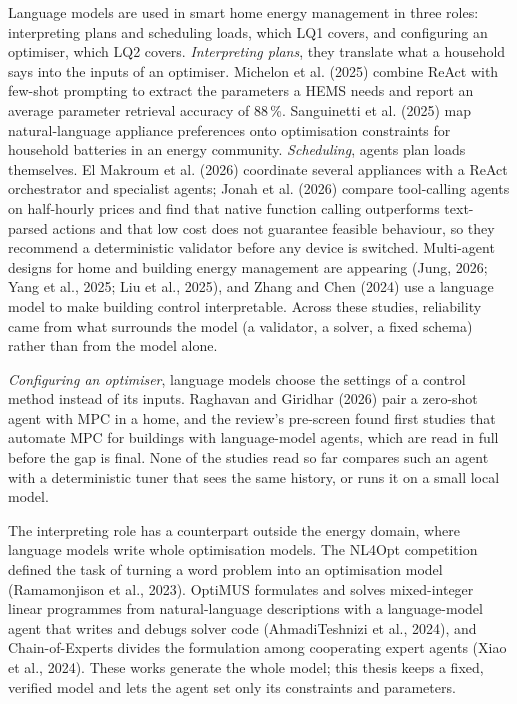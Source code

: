 \documentclass[12pt,a4paper]{report}
\begin{document}
Language models are used in smart home energy management in three
roles: interpreting plans and scheduling loads, which LQ1 covers, and
configuring an optimiser, which LQ2 covers. \textit{Interpreting
plans}, they translate what a household says into the inputs of an
optimiser. Michelon et al. (2025) combine ReAct with few-shot
prompting to extract the parameters a HEMS needs and report an average
parameter retrieval accuracy of 88\,\%. Sanguinetti et al. (2025) map
natural-language appliance preferences onto optimisation constraints
for household batteries in an energy community. \textit{Scheduling},
agents plan loads themselves. El Makroum et al. (2026) coordinate
several appliances with a ReAct orchestrator and specialist agents;
Jonah et al. (2026) compare tool-calling agents on half-hourly prices
and find that native function calling outperforms text-parsed actions
and that low cost does not guarantee feasible behaviour, so they
recommend a deterministic validator before any device is switched.
Multi-agent designs for home and building energy management are
appearing (Jung, 2026; Yang et al., 2025; Liu et al., 2025), and
Zhang and Chen (2024) use a language model to make building control
interpretable. Across these studies, reliability came
from what surrounds the model (a validator, a solver, a fixed schema)
rather than from the model alone.

\textit{Configuring an optimiser}, language models choose the settings
of a control method instead of its inputs. Raghavan and Giridhar (2026) pair
a zero-shot agent with MPC in a home, and the review's pre-screen found
first studies that automate MPC for buildings with language-model
agents, which are read in full before the gap is final. None of the
studies read so far compares such an agent with a deterministic tuner
that sees the same history, or runs it on a small local model.

The interpreting role has a counterpart outside the energy domain, where
language models write whole optimisation models. The NL4Opt competition
defined the task of turning a word problem into an optimisation model
(Ramamonjison et al., 2023). OptiMUS formulates and solves
mixed-integer linear programmes from natural-language descriptions with
a language-model agent that writes and debugs solver code
(AhmadiTeshnizi et al., 2024), and Chain-of-Experts divides the
formulation among cooperating expert agents (Xiao et al., 2024). These
works generate the whole model; this thesis keeps a fixed, verified
model and lets the agent set only its constraints and parameters.
\end{document}
